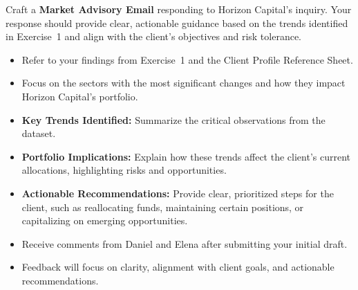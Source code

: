 \documentclass[11pt]{article}
\begin{document}


Craft a \textbf{Market Advisory Email} responding to Horizon Capital's inquiry.
Your response should provide clear, actionable guidance based on the trends
identified in Exercise~1 and align with the client's objectives and risk
tolerance.


\begin{itemize}[leftmargin=1.5em, itemsep=2pt]
  \item Refer to your findings from Exercise~1 and the Client Profile Reference
  Sheet.
  \item Focus on the sectors with the most significant changes and how they
  impact Horizon Capital's portfolio.
\end{itemize}

\begin{itemize}[leftmargin=1.5em, itemsep=2pt]
  \item \textbf{Key Trends Identified:} Summarize the critical observations
  from the dataset.
  \item \textbf{Portfolio Implications:} Explain how these trends affect the
  client's current allocations, highlighting risks and opportunities.
  \item \textbf{Actionable Recommendations:} Provide clear, prioritized steps
  for the client, such as reallocating funds, maintaining certain positions,
  or capitalizing on emerging opportunities.
\end{itemize}

\begin{itemize}[leftmargin=1.5em, itemsep=2pt]
  \item Receive comments from Daniel and Elena after submitting your initial
  draft.
  \item Feedback will focus on clarity, alignment with client goals, and
  actionable recommendations.
\end{itemize}
\end{document}
